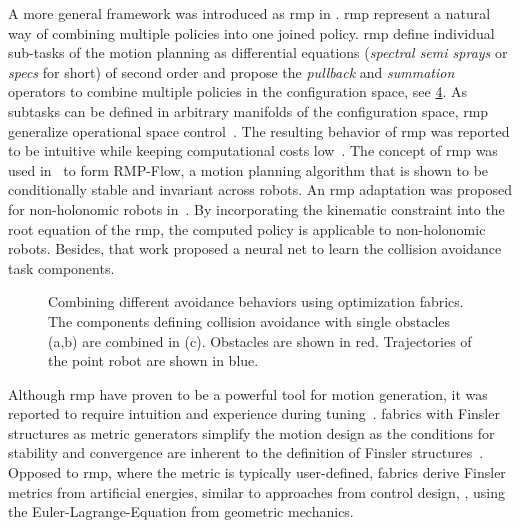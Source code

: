 %
A more general framework was introduced as \acf{rmp} in
\cite{Ratliff2018,Cheng2020,Li2021}. \Ac{rmp} represent a
natural way of combining multiple policies into one joined policy.
\ac{rmp} define individual sub-tasks of the motion planning as
differential equations (\textit{spectral semi sprays} or
\textit{specs} for short) of second order and propose the
\textit{pullback} and \textit{summation} operators to combine multiple policies
in the configuration space, see \cref{fig:spec_combination}. As subtasks can be defined in arbitrary manifolds
of the configuration space, \ac{rmp} generalize operational space
control~\cite{Khatib1987}. The resulting behavior of
\ac{rmp} was reported to be
intuitive while keeping computational costs low~\cite{Ratliff2018}. The concept
of \ac{rmp} was used in~\cite{Cheng2020,Cheng2020a} to form RMP-Flow, a motion
planning algorithm that is shown to be conditionally stable and invariant
across robots. An \ac{rmp} adaptation was proposed for non-holonomic robots
in~\cite{Meng2019}. By incorporating the kinematic constraint into the root
equation of the \ac{rmp}, the computed policy is applicable to non-holonomic robots.
Besides, that work proposed a neural net to learn the collision avoidance task
components. 
%
\begin{figure}[h]
  \centering
  \begin{subfigure}{0.33\linewidth}
    \centering
    
    \caption{}
    \label{subfig:trajectory_obst1}
  \end{subfigure}%
  \begin{subfigure}{0.33\linewidth}
    \centering
    
    \caption{}
    \label{subfig:trajectory_obst2}
  \end{subfigure}%
  \begin{subfigure}{0.33\linewidth}
    \centering
    
    \caption{}
    \label{subfig:trajectory_both_obstacles}
  \end{subfigure}
  \caption{
    Combining different avoidance behaviors using optimization fabrics. The
    components defining collision avoidance with single obstacles (a,b) are
    combined in (c). Obstacles are shown in red. Trajectories of the point
    robot are shown in blue.
  }
  \label{fig:spec_combination}
\end{figure}
%

Although \ac{rmp} have proven to be a powerful tool for
motion generation, it was reported to require intuition and
experience during tuning~\cite{Ratliff2020}. \Acf{fabrics}
with Finsler structures as metric generators simplify the
motion design as the conditions for stability and
convergence are inherent to the definition of Finsler
structures~\cite{Ratliff2020,Ratliff2021,ratliff2023fabrics,van2022geometric}. Opposed to
\ac{rmp}, where the metric is typically user-defined,
fabrics derive Finsler metrics from artificial energies,
similar to approaches from control design, \cite{l2,l3},
using the Euler-Lagrange-Equation from geometric mechanics.

